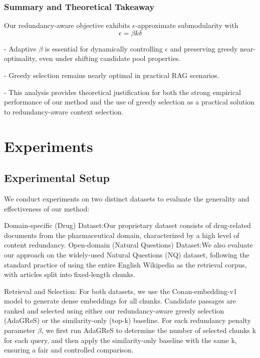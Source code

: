 \documentclass[11pt]{article}
\begin{document}
\subsubsection{Summary and Theoretical Takeaway}

Our redundancy-aware objective exhibits $\epsilon$-approximate submodularity with
\begin{equation}
  \label{eq:example}
  \epsilon = \beta k \delta
\end{equation}

- Adaptive $\beta$ is essential for dynamically controlling $\epsilon$ and preserving greedy near-optimality, even under shifting candidate pool properties.
    
- Greedy selection remains nearly optimal in practical RAG scenarios.
    
- This analysis provides theoretical justification for both the strong empirical performance of our method and the use of greedy selection as a practical solution to redundancy-aware context selection.

\section{Experiments}
\subsection{Experimental Setup}
We conduct experiments on two distinct datasets to evaluate the generality and effectiveness of our method:

Domain-specific (Drug) Dataset:Our proprietary dataset consists of drug-related documents from the pharmaceutical domain, characterized by a high level of content redundancy.
Open-domain (Natural Questions) Dataset:We also evaluate our approach on the widely-used Natural Questions (NQ) dataset, following the standard practice of using the entire English Wikipedia as the retrieval corpus, with articles split into fixed-length chunks.

Retrieval and Selection:
For both datasets, we use the Conan-embedding-v1 model to generate dense embeddings for all chunks. Candidate passages are ranked and selected using either our redundancy-aware greedy selection (AdaGReS) or the similarity-only (top-k) baseline. For each redundancy penalty parameter $\beta$, we first run AdaGReS to determine the number of selected chunks k for each query, and then apply the similarity-only baseline with the same k, ensuring a fair and controlled comparison.
\end{document}
